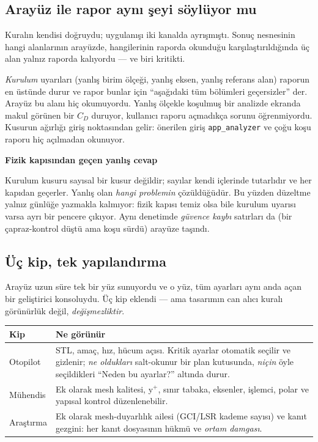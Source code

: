 \documentclass[11pt,a4paper]{article}
\newcommand{\kkkenar}{lacivert}
\newcommand{\kkzemin}{kod}
\newenvironment{renkkutu}[3]{%
  \renewcommand{\kkkenar}{#1}\renewcommand{\kkzemin}{#2}%
  \par\medskip\noindent
  \begin{lrbox}{\kutugovde}%
  \begin{minipage}{\dimexpr\linewidth-2\fboxsep-2\fboxrule\relax}\footnotesize
  \textcolor{#1}{\textbf{#3}}\par\vspace{3pt}%
}{%
  \end{minipage}%
  \end{lrbox}%
  \noindent\fcolorbox{\kkkenar}{\kkzemin}{\usebox{\kutugovde}}%
  \par\medskip
}
\newenvironment{dikkat}[1]{\begin{renkkutu}{orta}{ortabg}{#1}}{\end{renkkutu}}
\begin{document}
\subsection{Arayüz ile rapor aynı şeyi söylüyor mu}

Kuralın kendisi doğruydu; uygulanışı iki kanalda ayrışmıştı. Sonuç nesnesinin
hangi alanlarının arayüzde, hangilerinin raporda okunduğu karşılaştırıldığında
üç alan yalnız raporda kalıyordu --- ve biri kritikti.

\emph{Kurulum} uyarıları (yanlış birim ölçeği, yanlış eksen, yanlış referans
alan) raporun en üstünde durur ve rapor bunlar için ``aşağıdaki tüm bölümleri
geçersizler'' der. Arayüz bu alanı hiç okumuyordu. Yanlış ölçekle koşulmuş bir
analizde ekranda makul görünen bir $C_D$ duruyor, kullanıcı raporu açmadıkça
sorunu öğrenmiyordu. Kusurun ağırlığı giriş noktasından gelir: önerilen giriş
\texttt{app\_analyzer} ve çoğu koşu raporu hiç açılmadan okunuyor.

\begin{dikkat}{Fizik kapısından geçen yanlış cevap}
Kurulum kusuru sayısal bir kusur değildir; sayılar kendi içlerinde tutarlıdır ve
her kapıdan geçerler. Yanlış olan \emph{hangi problemin} çözüldüğüdür. Bu yüzden
düzeltme yalnız günlüğe yazmakla kalmıyor: fizik kapısı temiz olsa bile kurulum
uyarısı varsa ayrı bir pencere çıkıyor. Aynı denetimde \emph{güvence kaybı}
satırları da (bir çapraz-kontrol düştü ama koşu sürdü) arayüze taşındı.
\end{dikkat}

\subsection{Üç kip, tek yapılandırma}
\label{sub:kipler}

Arayüz uzun süre tek bir yüz sunuyordu ve o yüz, tüm ayarları aynı anda açan
bir geliştirici konsoluydu. Üç kip eklendi --- ama tasarımın can alıcı kuralı
görünürlük değil, \emph{değişmezliktir}.

\begin{center}\footnotesize
\begin{tabular}{@{}lp{95mm}@{}}
\toprule
\textbf{Kip} & \textbf{Ne görünür} \\
\midrule
Otopilot & STL, amaç, hız, hücum açısı. Kritik ayarlar otomatik seçilir ve
  gizlenir; \emph{ne oldukları} salt-okunur bir plan kutusunda, \emph{niçin}
  öyle seçildikleri ``Neden bu ayarlar?'' altında durur. \\
Mühendis & Ek olarak mesh kalitesi, y$^+$, sınır tabaka, eksenler, işlemci,
  polar ve yapısal kontrol düzenlenebilir. \\
Araştırma & Ek olarak mesh-duyarlılık ailesi (GCI/LSR kademe sayısı) ve kanıt
  gezgini: her kanıt dosyasının hükmü ve \emph{ortam damgası}. \\
\bottomrule
\end{tabular}
\end{center}
\end{document}
